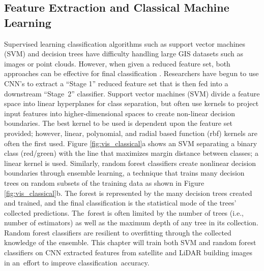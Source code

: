 \subsection{Feature Extraction and Classical Machine Learning}

Supervised learning classification algorithms such as support vector machines (SVM) and decision trees have difficulty handling large GIS datasets such as images or point clouds.  However,        when given a reduced feature set, both approaches can be  effective for final classification \cite{tang_deep_2015, mohajeri_city-scale_2018}. Researchers have begun to use \ac{CNN}'s to extract a ``Stage    1'' reduced feature set that is then fed into a downstream ``Stage~2'' classifier. 
Support vector machines (SVM) divide a feature space into linear hyperplanes for class separation, but often use kernels to project input features into higher-dimensional spaces to create non-linear decision boundaries. The best kernel to be used is dependent upon the feature set provided; however, linear, polynomial, and radial based function (rbf) kernels are often the first used. Figure \ref{fig:vis_classical}a shows an SVM separating a binary class (red/green) with the line that maximizes margin distance between classes; a linear kernel is used.
Similarly, random forest classifiers create nonlinear decision boundaries through ensemble learning, a technique that trains many decision trees on random subsets of the training data as shown in Figure \ref{fig:vis_classical}b. The forest is represented by the many decision trees created and trained, and the final classification is the statistical mode of the trees' collected predictions.  The~forest is often limited by the number of trees (i.e., number of estimators) as well as the maximum depth of any tree in its collection.  Random forest classifiers are resilient to overfitting through the collected knowledge of the ensemble. This chapter will train both SVM and random forest classifiers on \ac{CNN} extracted features from satellite and LiDAR building images in an~effort to improve classification~accuracy.

